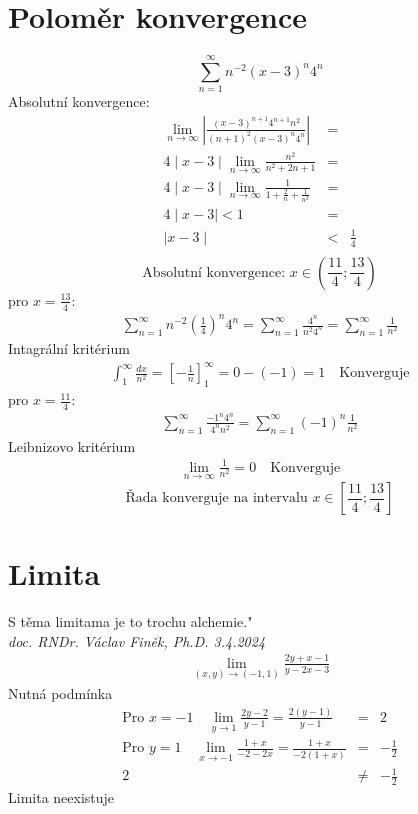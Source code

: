 \documentclass{article}
\begin{document}
\section{Poloměr konvergence}
\begin{equation*}
\sum_{n=1}^\infty n^{-2} (x-3)^n 4^n 
\end{equation*}
Absolutní konvergence:
\\
\begin{eqnarray*}
\lim_{n\rightarrow\infty}\left|\frac{(x-3)^{n+1} 4^{n+1} n^2}{(n+1)^2 (x-3)^n 4^n}\right| &=& \\
4\mid x-3\mid\lim_{n\rightarrow\infty}\frac{n^2}{n^2+2n+1}&=&\\
4\mid x-3\mid\lim_{n\rightarrow\infty}\frac{1}{1+\frac{2}{n}+\frac{1}{n^2}}&=&\\
4\mid x-3\mid<1&=&\\
\mid x-3\mid&<&\frac{1}{4}\\
\end{eqnarray*}
\begin{equation}
\text{Absolutní konvergence: } x\in\left(\frac{11}{4};\frac{13}{4}\right)
\end{equation}
pro $x=\frac{13}{4}$:
\begin{eqnarray*}
\sum_{n=1}^\infty n^{-2} \left(\frac{1}{4}\right)^n 4^n=\sum_{n=1}^\infty \frac{4^n}{n^2 4^n}=\sum_{n=1}^\infty \frac{1}{n^2}
\end{eqnarray*}
Intagrální kritérium
\begin{eqnarray*}
\int_{1}^{\infty}\frac{dx}{n^2}=\left[-\frac{1}{n}\right]_{1}^{\infty}=0-(-1)=1 \quad\text{Konverguje}
\end{eqnarray*}
pro $x=\frac{11}{4}$:
\begin{eqnarray*}
\sum_{n=1}^\infty \frac{-1^n 4^n}{4^n n^2}=\sum_{n=1}^\infty (-1)^n\frac{1}{n^2}
\end{eqnarray*}
Leibnizovo kritérium
\begin{eqnarray*}
\lim_{n\rightarrow\infty}\frac{1}{n^2}=0\quad\text{Konverguje}
\end{eqnarray*}
\begin{equation*}
\text{Řada konverguje na intervalu  }x\in\left[ \frac{11}{4};\frac{13}{4}\right]
\end{equation*}
\section{Limita}
\quotedblbase S těma limitama je to trochu alchemie."\\
\textit{doc. RNDr. Václav Finěk, Ph.D. 3.4.2024}
\begin{eqnarray*}
\lim_{(x,y)\rightarrow(-1,1)}\frac{2y+x-1}{y-2x-3}
\end{eqnarray*}
Nutná podmínka
\begin{eqnarray*}
\text{Pro }x=-1\quad\lim_{y\rightarrow 1}\frac{2y-2}{y-1}=\frac{2(y-1)}{y-1}&=&2\\
\text{Pro }y=1\quad\lim_{x\rightarrow -1}\frac{1+x}{-2-2x}=\frac{1+x}{-2(1+x)}&=&-\frac{1}{2}\\
2&\neq&-\frac{1}{2}
\end{eqnarray*}
Limita neexistuje
\end{document}
